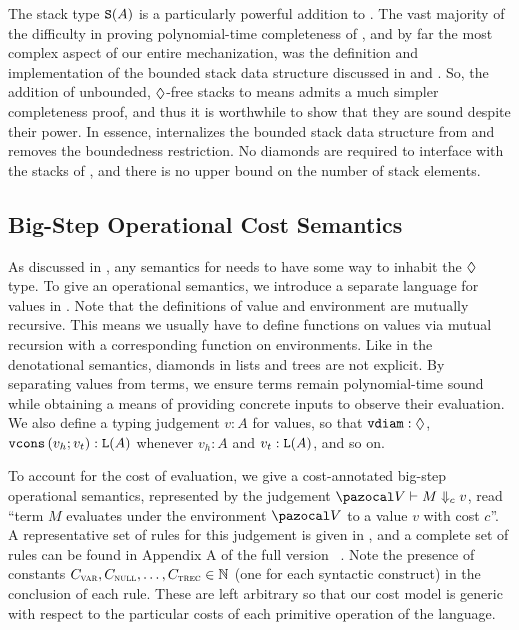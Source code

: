 


\enlargethispage{\baselineskip}
The stack type $\tpstack{A}$ is a particularly powerful addition to \lfpl. The vast majority of the difficulty in proving polynomial-time completeness of \lfpl, and by far the most complex aspect of our entire mechanization, was the definition and implementation of the bounded stack data structure discussed in  and . So, the addition of unbounded, $\tpdiam$-free stacks to \lfpl means \lfplplus admits a much simpler completeness proof, and thus it is worthwhile to show that they are sound despite their power. In essence, \lfplplus internalizes the bounded stack data structure from  and removes the boundedness restriction. No diamonds are required to interface with the stacks of \lfplplus, and there is no upper bound on the number of stack elements.



\subsection{Big-Step Operational Cost Semantics}
\label{sec:operational-semantics}

As discussed in , any semantics for \lfplplus needs to have some way to inhabit the $\tpdiam$ type. To give \lfplplus an operational semantics, we introduce a separate language for \lfplplus values in . Note that the definitions of value and environment are mutually recursive. This means we usually have to define functions on values via mutual recursion with a corresponding function on environments. Like in the denotational semantics, diamonds in lists and trees are not explicit.
%
By separating values from terms, we ensure \lfplplus terms remain polynomial-time sound while obtaining a means of providing concrete inputs to observe their evaluation. We also define a typing judgement $v : A$ for values, so that $\vdiam : \tpdiam$, $\vcons{v_h}{v_t} : \tplist{A}$ whenever $v_h : A$ and $v_t : \tplist{A}$, and so on.




To account for the cost of evaluation, we give a cost-annotated big-step operational semantics, represented by the judgement $\evals{\env}{M}{c}{v}$, read ``term $M$ evaluates under the environment $\env$ to a value $v$ with cost $c$''. A representative set of rules for this judgement is given in , and a complete set of rules can be found in{
  \ifdefined\FULLVERSION
  \else
    Appendix A of the full version~\cite{fullversion}%
  \fi
}. Note the presence of constants $C_{\textsc{var}}, C_{\textsc{null}}, \ldots, C_{\textsc{trec}} \in \mathbb N$ (one for each syntactic construct) in the conclusion of each rule. These are left arbitrary so that our cost model is generic with respect to the particular costs of each primitive operation of the language.

